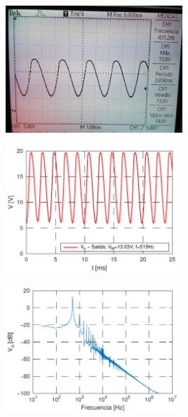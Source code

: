 \documentclass[a4paper, 10pt, spanish]{article}
\begin{document}
        \begin{center}
          \includegraphics[width=0.5\textwidth]{med_oscilador_cc.png}
          \label{fig:med_out_oscilador}
        \end{center}

        \begin{center}
          \includegraphics[width=0.5\textwidth]{salida_oscilador.png}
          \label{fig:sim_out_oscilador}
        \end{center}


        \begin{center}
          \includegraphics[width=0.5\textwidth]{fft_oscilador.png}
          \label{fig:fft}
        \end{center}



\end{document}
